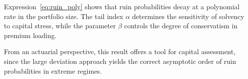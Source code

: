 \documentclass[11pt,reqno]{amsart}
\theoremstyle{definition}
\theoremstyle{remark}
\numberwithin{equation}{section}
\newcommand{\PP}{\mathbb{P}}
\begin{document}
Expression~\eqref{eq:ruin_poly} shows that ruin probabilities decay at a
polynomial rate in the portfolio size. The tail index $\alpha$ determines the
sensitivity of solvency to capital stress, while the parameter $\beta$ controls
the degree of conservatism in premium loading.

From an actuarial perspective, this result offers a  tool for capital  assessment, since the large deviation approach yields the correct asymptotic order of ruin probabilities in extreme regimes.






%
%
%
%
%
\end{document}
